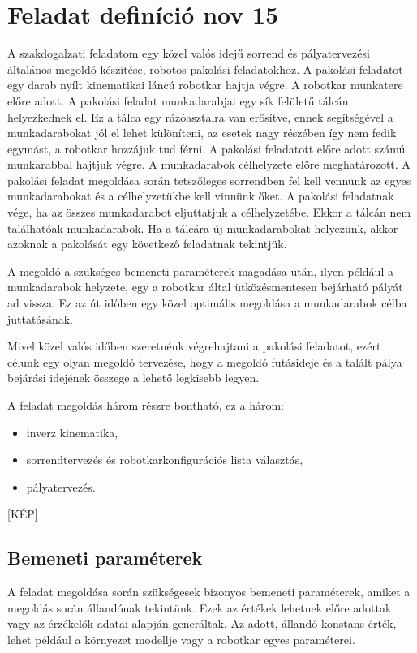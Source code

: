 \chapter{Feladat definíció nov 15}

A szakdogalzati feladatom egy közel valós idejű sorrend és pályatervezési általános megoldó készítése, robotos pakolási feladatokhoz. 
A pakolási feladatot egy darab nyílt kinematikai láncú robotkar hajtja végre. A robotkar munkatere előre adott. A pakolási feladat munkadarabjai egy sík felületű tálcán helyezkednek el. Ez a tálca egy rázóasztalra van erősítve, ennek segítségével a munkadarabokat jól el lehet különíteni, az esetek nagy részében így nem fedik egymást, a robotkar hozzájuk tud férni. A pakolási feladatott előre adott számú munkarabbal hajtjuk végre. A munkadarabok célhelyzete előre meghatározott. A pakolási feladat megoldása során tetszőleges sorrendben fel kell vennünk az egyes munkadarabokat és a célhelyzetükbe kell vinnünk őket. A pakolási feladatnak vége, ha az összes munkadarabot eljuttatjuk a célhelyzetébe. Ekkor a tálcán nem találhatóak munkadarabok. Ha a tálcára új munkadarabokat helyezünk, akkor azoknak a pakolását egy következő feladatnak tekintjük.

A megoldó a szükséges bemeneti paraméterek magadása után, ilyen például a munkadarabok helyzete, egy a robotkar által ütközésmentesen bejárható pályát ad vissza. Ez az út időben egy közel optimális megoldása a munkadarabok célba juttatásának.

Mivel közel valós időben szeretnénk végrehajtani a pakolási feladatot, ezért célunk egy olyan megoldó tervezése, hogy a megoldó futásideje és a talált pálya bejárási idejének összege a lehető legkisebb legyen.

A feladat megoldás három részre bontható, ez a három: 
\begin{itemize}
\item {inverz kinematika,}
\item {sorrendtervezés és robotkarkonfigurációs lista választás,} 
\item {pályatervezés.}  
\end{itemize}

[KÉP]

\section{Bemeneti paraméterek}

A feladat megoldása során szükségesek bizonyos bemeneti paraméterek, amiket a megoldás során állandónak tekintünk. Ezek az értékek lehetnek előre adottak vagy az érzékelők adatai alapján generáltak. Az adott, állandó konstans érték, lehet például a környezet modellje vagy a robotkar egyes paraméterei.  

